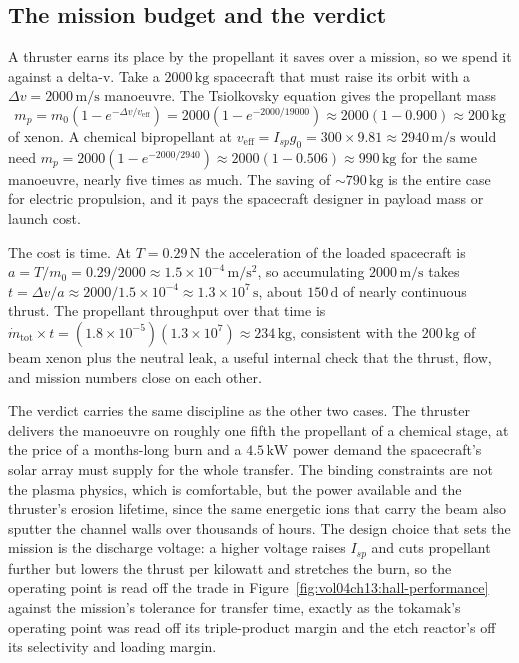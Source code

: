 

\subsection{The mission budget and the verdict}

A thruster earns its place by the propellant it saves over a mission, so we
spend it against a delta-v. Take a $2000\,\si{\kilo\gram}$ spacecraft that
must raise its orbit with a $\Delta v = 2000\,\si{\meter\per\second}$
manoeuvre. The Tsiolkovsky equation gives the propellant mass
\[
m_{p} = m_{0}\left(1 - e^{-\Delta v/v_{\mathrm{eff}}}\right)
= 2000\left(1 - e^{-2000/19000}\right)
\approx 2000(1 - 0.900) \approx 200\,\si{\kilogram}
\]
of xenon. A chemical bipropellant at $v_{\mathrm{eff}} = I_{sp}g_{0} =
300\times 9.81 \approx 2940\,\si{\meter\per\second}$ would need $m_{p} =
2000(1 - e^{-2000/2940}) \approx 2000(1 - 0.506) \approx 990\,\si{\kilogram}$
for the same manoeuvre, nearly five times as much. The saving of $\sim
790\,\si{\kilogram}$ is the entire case for electric propulsion, and it pays
the spacecraft designer in payload mass or launch cost.

The cost is time. At $T = 0.29\,\si{\newton}$ the acceleration of the loaded
spacecraft is $a = T/m_{0} = 0.29/2000 \approx 1.5\times 10^{-4}\,\si{\meter
\per\second\squared}$, so accumulating $2000\,\si{\meter\per\second}$ takes
$t = \Delta v/a \approx 2000/1.5\times 10^{-4} \approx 1.3\times 10^{7}\,\si{
\second}$, about $150\,\si{\day}$ of nearly continuous thrust. The propellant
throughput over that time is $\dot{m}_{\mathrm{tot}}\times t = (1.8\times
10^{-5})(1.3\times 10^{7}) \approx 234\,\si{\kilogram}$, consistent with the
$200\,\si{\kilogram}$ of beam xenon plus the neutral leak, a useful internal
check that the thrust, flow, and mission numbers close on each other.

The verdict carries the same discipline as the other two cases. The thruster
delivers the manoeuvre on roughly one fifth the propellant of a chemical
stage, at the price of a months-long burn and a $4.5\,\si{\kilo\watt}$ power
demand the spacecraft's solar array must supply for the whole transfer. The
binding constraints are not the plasma physics, which is comfortable, but the
power available and the thruster's erosion lifetime, since the same energetic
ions that carry the beam also sputter the channel walls over thousands of
hours. The design choice that sets the mission is the discharge voltage: a
higher voltage raises $I_{sp}$ and cuts propellant further but lowers the
thrust per kilowatt and stretches the burn, so the operating point is read
off the trade in Figure~\ref{fig:vol04ch13:hall-performance} against the
mission's tolerance for transfer time, exactly as the tokamak's operating
point was read off its triple-product margin and the etch reactor's off its
selectivity and loading margin.

